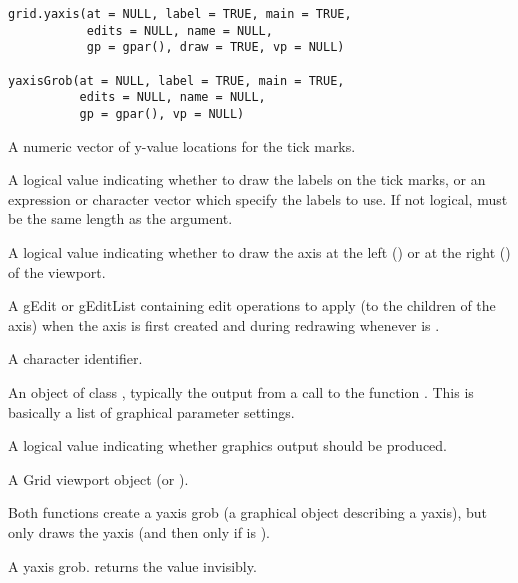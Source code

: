 %
\begin{Usage}
\begin{verbatim}
grid.yaxis(at = NULL, label = TRUE, main = TRUE,
           edits = NULL, name = NULL,
           gp = gpar(), draw = TRUE, vp = NULL)

yaxisGrob(at = NULL, label = TRUE, main = TRUE,
          edits = NULL, name = NULL,
          gp = gpar(), vp = NULL)
\end{verbatim}
\end{Usage}
%
\begin{Arguments}
\begin{ldescription}
\item[\code{at}] A numeric vector of y-value locations for the tick marks.
\item[\code{label}] A logical value indicating whether to draw the labels
on the tick marks, or an expression or character vector which
specify the labels to use.  If not logical, must be the same
length as the  argument.
\item[\code{main}] A logical value indicating whether to draw the axis
at the left () or at the right () of the
viewport.
\item[\code{edits}] A gEdit or gEditList containing edit operations
to apply (to the children of the axis)
when the axis is first created and during redrawing
whenever  is .

\item[\code{name}]  A character identifier. 
\item[\code{gp}] An object of class , typically the output
from a call to the function .  This is basically
a list of graphical parameter settings.
\item[\code{draw}] A logical value indicating whether graphics output
should be produced.
\item[\code{vp}] A Grid viewport object (or ).
\end{ldescription}
\end{Arguments}
%
\begin{Details}\relax
Both functions create a yaxis grob (a graphical object describing a
yaxis), but only 
draws the yaxis (and then only if  is ).

\end{Details}
%
\begin{Value}
A yaxis grob.   returns the value invisibly.
\end{Value}
